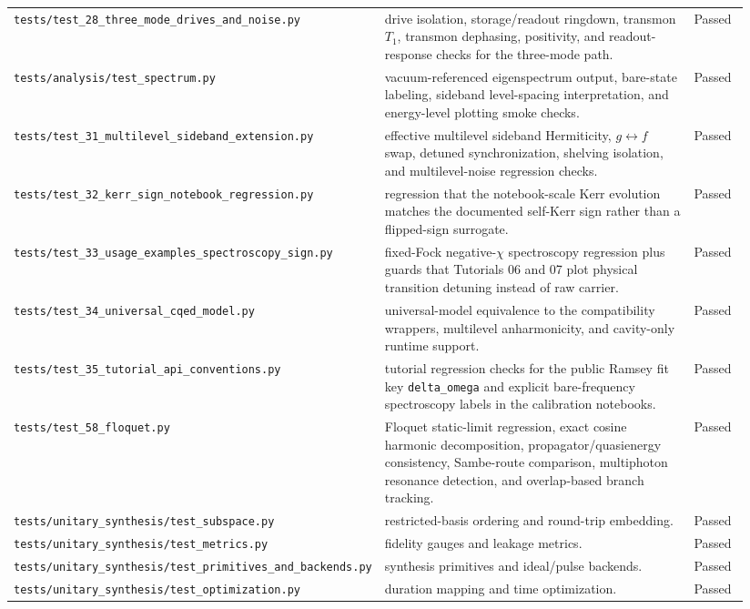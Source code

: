 \documentclass[11pt]{article}
\begin{document}
\begin{longtable}{p{0.30\linewidth} p{0.56\linewidth} p{0.08\linewidth}}
\texttt{tests/test\_28\_three\_mode\_drives\_and\_noise.py} & drive isolation, storage/readout ringdown, transmon \(T_1\), transmon dephasing, positivity, and readout-response checks for the three-mode path. & Passed \\
\texttt{tests/analysis/test\_spectrum.py} & vacuum-referenced eigenspectrum output, bare-state labeling, sideband level-spacing interpretation, and energy-level plotting smoke checks. & Passed \\
\texttt{tests/test\_31\_multilevel\_sideband\_extension.py} & effective multilevel sideband Hermiticity, \(g\leftrightarrow f\) swap, detuned synchronization, shelving isolation, and multilevel-noise regression checks. & Passed \\
\texttt{tests/test\_32\_kerr\_sign\_notebook\_regression.py} & regression that the notebook-scale Kerr evolution matches the documented self-Kerr sign rather than a flipped-sign surrogate. & Passed \\
\texttt{tests/test\_33\_usage\_examples\_spectroscopy\_sign.py} & fixed-Fock negative-\(\chi\) spectroscopy regression plus guards that Tutorials 06 and 07 plot physical transition detuning instead of raw carrier. & Passed \\
\texttt{tests/test\_34\_universal\_cqed\_model.py} & universal-model equivalence to the compatibility wrappers, multilevel anharmonicity, and cavity-only runtime support. & Passed \\
\texttt{tests/test\_35\_tutorial\_api\_conventions.py} & tutorial regression checks for the public Ramsey fit key \texttt{delta\_omega} and explicit bare-frequency spectroscopy labels in the calibration notebooks. & Passed \\
\texttt{tests/test\_58\_floquet.py} & Floquet static-limit regression, exact cosine harmonic decomposition, propagator/quasienergy consistency, Sambe-route comparison, multiphoton resonance detection, and overlap-based branch tracking. & Passed \\
\texttt{tests/unitary\_synthesis/test\_subspace.py} & restricted-basis ordering and round-trip embedding. & Passed \\
\texttt{tests/unitary\_synthesis/test\_metrics.py} & fidelity gauges and leakage metrics. & Passed \\
\texttt{tests/unitary\_synthesis/test\_primitives\_and\_backends.py} & synthesis primitives and ideal/pulse backends. & Passed \\
\texttt{tests/unitary\_synthesis/test\_optimization.py} & duration mapping and time optimization. & Passed \\

\end{longtable}
\end{document}
